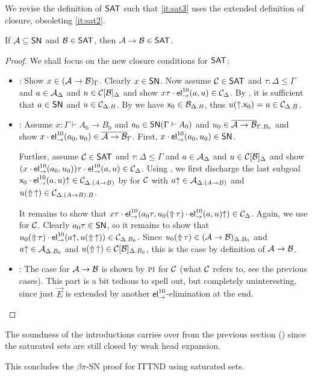 We revise the definition of $\mathsf{SAT}$ such that \ref{it:sat3} uses the
extended definition of closure, obsoleting \ref{it:sat2}.


\begin{lemma}
  \label{lem:fun-sat-pi}
  If $\mathcal{A} \subseteq \mathsf{SN}$ and $\mathcal{B} \in \mathsf{SAT}$, then $\mathcal{A} \to \mathcal{B} \in \mathsf{SAT}$.
\end{lemma}
\begin{proof}
  We shall focus on the new closure conditions for $\mathsf{SAT}$:
\begin{itemize}
\item \rvar: Show $x \in (\mathcal{A} \to \mathcal{B})_\Gamma$.  Clearly $x \in \mathsf{SN}$.
  Now assume $\mathcal{C} \in \mathsf{SAT}$ and $\tau : \Delta \leq \Gamma$ and
  $a \in \mathcal{A}_\Delta$ and $u \in \mathcal{C}[\mathcal{B}]_\Delta$ and show
  $x\tau \cdot \mathsf{el}_{\to}^{10}(a,u) \in \mathcal{C}_\Delta$.
  By \rel, it is sufficient that $a \in \mathsf{SN}$ and
  $u \in \mathcal{C}_{\Delta.B}$.
  By \rvar we have $\mathsf{x}_0 \in \mathcal{B}_{\Delta.B}$,
  thus $u(\mathord{\uparrow}.\mathsf{x}_0) = u \in \mathcal{C}_{\Delta.B}$.

\item \rel: Assume $x : \Gamma \vdash A_0 \to B_0$ and
  $a_0 \in \mathsf{SN}(\Gamma \vdash A_0)$ and
  $u_0 \in \overline{\mathcal{A} \to \mathcal{B}}_{\Gamma.B_0}$ and show
  $x \cdot \mathsf{el}_{\to}^{10}(a_0,u_0) \in \overline{\mathcal{A} \to \mathcal{B}}_\Gamma$.
  First, $x \cdot \mathsf{el}_{\to}^{10}(a_0,u_0) \in \mathsf{SN}$.

  Further, assume $\mathcal{C} \in \mathsf{SAT}$ and $\tau : \Delta \leq \Gamma$
  and $a \in \mathcal{A}_\Delta$ and $u \in \mathcal{C}[\mathcal{B}]_\Delta$ and show
  $(x \cdot \mathsf{el}_{\to}^{10}(a_0,u_0))\tau \cdot \mathsf{el}_{\to}^{10}(a,u) \in \mathcal{C}_\Delta$.
  Using \rpi, we first discharge the last subgoal $\mathsf{x}_0 \cdot
  \mathsf{el}_{\to}^{10}(a,u)\mathord{\uparrow} \in \mathcal{C}_{\Delta.(A \to B)}$ by \rel for $\mathcal{C}$ with
  $a\mathord{\uparrow} \in \mathcal{A}_{\Delta.(A \to B)}$ and $u(\mathop{\Uparrow}\mathord{\uparrow}) \in \mathcal{C}_{\Delta.(A\to
    B).B}$.

  It remains to show that $x\tau \cdot \mathsf{el}_{\to}^{10}(a_0\tau, u_0(\mathop{\Uparrow}\tau) \cdot
  \mathsf{el}_{\to}^{10}(a,u)\mathord{\uparrow}) \in \mathcal{C}_\Delta$.  Again, we use \rel for $\mathcal{C}$.
  Clearly $a_0\tau \in \mathsf{SN}$, so it remains to show that
  $u_0(\mathop{\Uparrow}\tau) \cdot \mathsf{el}_{\to}^{10}(a\mathord{\uparrow},u(\mathop{\Uparrow}\mathord{\uparrow})) \in \mathcal{C}_{\Delta.B_0}$.
  Since $u_0(\mathop{\Uparrow}\tau) \in (\mathcal{A} \to \mathcal{B})_{\Delta.B_0}$
  and $a\mathord{\uparrow} \in \mathcal{A}_{\Delta.B_0}$ and $u(\mathop{\Uparrow}\mathord{\uparrow}) \in
  \mathcal{C}[\mathcal{B}]_{\Delta.B_0}$,
  this is the case by definition of $\mathcal{A} \to \mathcal{B}$.

\item \rpi:
  The case \rpi for $\mathcal{A} \to \mathcal{B}$ is shown by $\mbox{\textsc{pi}}$ for $\mathcal{C}$ (what $\mathcal{C}$
  refers to, see the previous cases).  This part is a bit tedious to
  spell out, but completely uninteresting, since just $\vec E$ is extended
  by another $\mathsf{el}_{\to}^{10}$-elimination at the end.
%
\popQED
\end{itemize}
\end{proof}

The soundness of the introductions carries over from the previous
section () since the saturated sets are still
closed by weak head expansion.

This concludes the $\beta\pi$-SN proof for ITTND using saturated sets.

